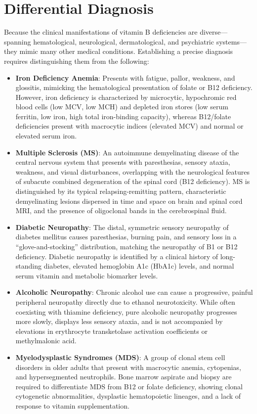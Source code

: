 \section*{Differential Diagnosis}
Because the clinical manifestations of vitamin B deficiencies are diverse---spanning hematological, neurological, dermatological, and psychiatric systems---they mimic many other medical conditions. Establishing a precise diagnosis requires distinguishing them from the following:

\begin{itemize}
    \item \textbf{Iron Deficiency Anemia}: Presents with fatigue, pallor, weakness, and glossitis, mimicking the hematological presentation of folate or B12 deficiency. However, iron deficiency is characterized by microcytic, hypochromic red blood cells (low MCV, low MCH) and depleted iron stores (low serum ferritin, low iron, high total iron-binding capacity), whereas B12/folate deficiencies present with macrocytic indices (elevated MCV) and normal or elevated serum iron.
    \item \textbf{Multiple Sclerosis (MS)}: An autoimmune demyelinating disease of the central nervous system that presents with paresthesias, sensory ataxia, weakness, and visual disturbances, overlapping with the neurological features of subacute combined degeneration of the spinal cord (B12 deficiency). MS is distinguished by its typical relapsing-remitting pattern, characteristic demyelinating lesions dispersed in time and space on brain and spinal cord MRI, and the presence of oligoclonal bands in the cerebrospinal fluid.
    \item \textbf{Diabetic Neuropathy}: The distal, symmetric sensory neuropathy of diabetes mellitus causes paresthesias, burning pain, and sensory loss in a ``glove-and-stocking'' distribution, matching the neuropathy of B1 or B12 deficiency. Diabetic neuropathy is identified by a clinical history of long-standing diabetes, elevated hemoglobin A1c (HbA1c) levels, and normal serum vitamin and metabolic biomarker levels.
    \item \textbf{Alcoholic Neuropathy}: Chronic alcohol use can cause a progressive, painful peripheral neuropathy directly due to ethanol neurotoxicity. While often coexisting with thiamine deficiency, pure alcoholic neuropathy progresses more slowly, displays less sensory ataxia, and is not accompanied by elevations in erythrocyte transketolase activation coefficients or methylmalonic acid.
    \item \textbf{Myelodysplastic Syndromes (MDS)}: A group of clonal stem cell disorders in older adults that present with macrocytic anemia, cytopenias, and hypersegmented neutrophils. Bone marrow aspirate and biopsy are required to differentiate MDS from B12 or folate deficiency, showing clonal cytogenetic abnormalities, dysplastic hematopoietic lineages, and a lack of response to vitamin supplementation.

\end{itemize}
